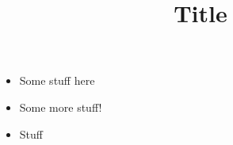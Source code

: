 \documentclass{article}
\title{Title}
\date{}
\begin{document}
	\maketitle
	 
		\begin{itemize}
			\item Some stuff here
			\item Some more stuff!
			\item Stuff
		\end{itemize}
\end{document}
